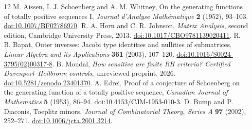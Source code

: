 \documentclass[11pt]{amsart}
\begin{document}
\begin{thebibliography}{12}
M. Aissen, I. J. Schoenberg and A. M. Whitney,
On the generating functions of totally positive sequences I,
\emph{Journal d'Analyse Math\'ematique} \textbf{2} (1952), 93--103.
\href{https://doi.org/10.1007/BF02786970}{doi:10.1007/BF02786970}.
R. A. Horn and C. R. Johnson, \emph{Matrix Analysis}, second edition,
Cambridge University Press, 2013.
\href{https://doi.org/10.1017/CBO9781139020411}{doi:10.1017/CBO9781139020411}.
R. B. Bapat, Outer inverses: Jacobi type identities and nullities of submatrices,
\emph{Linear Algebra and its Applications} \textbf{361} (2003), 107--120.
\href{https://doi.org/10.1016/S0024-3795(02)00317-8}{doi:10.1016/S0024-3795(02)00317-8}.
B. Mondal, \emph{How sensitive are finite RH criteria? Certified Davenport--Heilbronn controls},
unreviewed preprint, 2026.
\href{https://doi.org/10.5281/zenodo.23401370}{doi:10.5281/zenodo.23401370}.
A. Edrei, Proof of a conjecture of Schoenberg on the generating function of a totally positive sequence, \emph{Canadian Journal of Mathematics} \textbf{5} (1953), 86--94.
\href{https://doi.org/10.4153/CJM-1953-010-3}{doi:10.4153/CJM-1953-010-3}.
D. Bump and P. Diaconis, Toeplitz minors, \emph{Journal of Combinatorial Theory, Series A} \textbf{97} (2002), 252--271.
\href{https://doi.org/10.1006/jcta.2001.3214}{doi:10.1006/jcta.2001.3214}.
\end{thebibliography}
\end{document}
